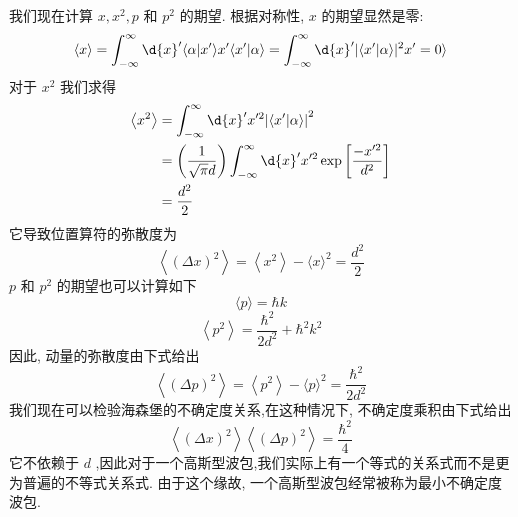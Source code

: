 \documentclass[lang=cn,newtx,10pt,scheme=chinese,thmcnt=section]{elegantbook}
\begin{document}
我们现在计算 $x,{x}^{2}, p$ 和 ${p}^{2}$ 的期望. 根据对称性, $x$ 的期望显然是零:
\begin{equation}
	\langle x\rangle = \int_{-\infty }^{\infty }\d{x}^{\prime }\langle {\alpha | {{x}^{\prime }\rangle {x}^{\prime }\langle {{x}^{\prime } | \alpha }\rangle = \int_{-\infty }^{\infty }\d{x}^{\prime }}| \langle {{x}^{\prime } | \alpha }\rangle { | }^{2}{x}^{\prime } = 0}\rangle
\end{equation}
对于 ${x}^{2}$ 我们求得
\begin{equation}
	\begin{aligned}
		\left\langle {x}^{2}\right\rangle &=\int_{-\infty }^{\infty }\d{x}^{\prime }{x}^{\prime 2}{\left| \left\langle {x}^{\prime } | \alpha \right\rangle \right| }^{2}\\
		&= \left( \frac{1}{\sqrt{\pi }d}\right) \int_{-\infty }^{\infty }\d{x}^{\prime }{x}^{\prime 2}\exp \left\lbrack \frac{-{x}^{\prime 2}}{{d}^{2}}\right\rbrack\\
		&= \frac{{d}^{2}}{2}
	\end{aligned}
\end{equation}
它导致位置算符的弥散度为
\begin{equation}
	\left\langle {\left( \Delta x\right) }^{2}\right\rangle = \left\langle {x}^{2}\right\rangle - \langle x{\rangle }^{2} = \frac{{d}^{2}}{2}
\end{equation}
$p$ 和 ${p}^{2}$ 的期望也可以计算如下
\begin{equation}
	\langle p\rangle = \hbar k
\end{equation}
\begin{equation}
	\left\langle {p}^{2}\right\rangle = \frac{{\hbar }^{2}}{2{d}^{2}} + {\hbar }^{2}{k}^{2}
\end{equation}
因此, 动量的弥散度由下式给出
\begin{equation}
	\left\langle {\left( \Delta p\right) }^{2}\right\rangle = \left\langle {p}^{2}\right\rangle - \langle p{\rangle }^{2} = \frac{{\hbar }^{2}}{2{d}^{2}}
\end{equation}
我们现在可以检验海森堡的不确定度关系,在这种情况下, 不确定度乘积由下式给出
\begin{equation}
	\left\langle {\left( \Delta x\right) }^{2}\right\rangle \left\langle {\left( \Delta p\right) }^{2}\right\rangle = \frac{{\hbar }^{2}}{4}
\end{equation}
它不依赖于 $d$ ,因此对于一个高斯型波包,我们实际上有一个等式的关系式而不是更为普遍的不等式关系式. 由于这个缘故, 一个高斯型波包经常被称为最小不确定度波包.
\end{document}
